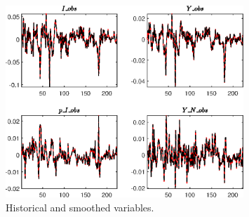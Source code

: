  
\begin{figure}[H]
\centering 
\includegraphics[width=0.80\textwidth]{BRS_growth/graphs/BRS_growth_HistoricalAndSmoothedVariables1}
\caption{Historical and smoothed variables.}\label{Fig:HistoricalAndSmoothedVariables:1}
\end{figure}


